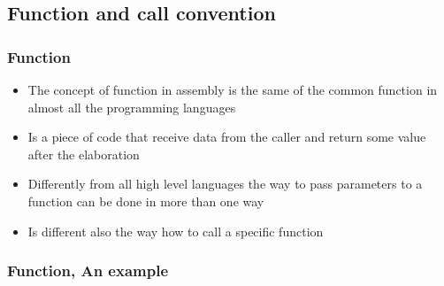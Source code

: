\documentclass[]{beamer}
\begin{document}
\subsection{Function and call convention}
		\begin{frame}
			\frametitle{Function}
			\begin{itemize}
				\item{The concept of function in assembly is the same of the common function in almost all the programming languages }
				\item{Is a piece of code that receive data from the caller and return some value after the elaboration}
				\item{Differently from all high level languages the way to pass parameters to a function can be done in more than one way}
				\item{Is different also the way how to call a specific function}
			\end{itemize}
		\end{frame}
		\begin{frame}
			\frametitle{Function, An example}
				\begin{figure}
				\end{figure}
		\end{frame}
\end{document}
